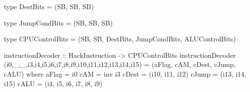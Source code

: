\begin{haskellcode}
    type DestBits = (SB, SB, SB)

    type JumpCondBits = (SB, SB, SB)

    type CPUControlBits = (SB, SB, DestBits, JumpCondBits, ALUControlBits)

    instructionDecoder :: HackInstruction -> CPUControlBits
    instructionDecoder (i0,_,_,i3,i4,i5,i6,i7,i8,i9,i10,i11,i12,i13,i14,i15)
            = (aFlag, cAM, cDest, cJump, cALU)
        where
            aFlag = i0
            cAM   = inv i3
            cDest = (i10, i11, i12)
            cJump = (i13, i14, i15)
            cALU  = (i4, i5, i6, i7, i8, i9)
\end{haskellcode}
